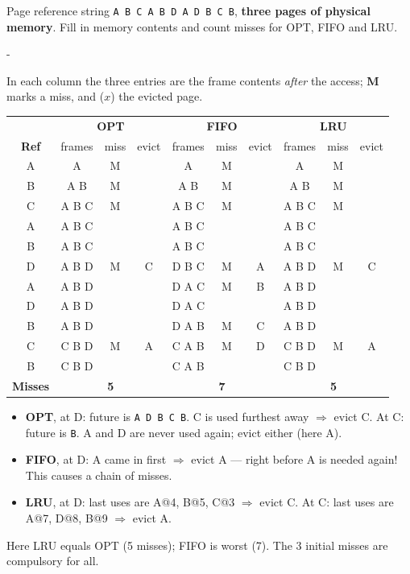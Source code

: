 \documentclass[11pt,a4paper]{article}
\makeatletter
\newcommand{\keepspace}[1]{\par\penalty-100\begingroup
  \setlength{\dimen@}{#1}\dimen@ii\pagegoal\advance\dimen@ii-\pagetotal
  \ifdim\dimen@>\dimen@ii\ifdim\dimen@ii>\z@\vfil\fi\break\fi\endgroup}
\makeatother
\begin{document}
\begin{quizbox}
Page reference string \texttt{A B C A B D A D B C B}, \textbf{three pages
of physical memory}. Fill in memory contents and count misses for OPT,
FIFO and LRU.
\end{quizbox}

\keepspace{22\baselineskip}
\begin{solbox}[Solution]
In each column the three entries are the frame contents \emph{after} the
access; \textbf{M} marks a miss, and (\(x\)) the evicted page.
\begin{center}
\renewcommand{\arraystretch}{1.08}
\setlength{\tabcolsep}{5pt}
\begin{tabular}{@{}c|ccc|ccc|ccc@{}}
  \toprule
  & \multicolumn{3}{c|}{\textbf{OPT}} & \multicolumn{3}{c|}{\textbf{FIFO}} & \multicolumn{3}{c}{\textbf{LRU}} \\
  \textbf{Ref} & frames & miss & evict & frames & miss & evict & frames & miss & evict \\
  \midrule
  A & A      & M &   & A     & M &   & A     & M & \\
  B & A B    & M &   & A B   & M &   & A B   & M & \\
  C & A B C  & M &   & A B C & M &   & A B C & M & \\
  A & A B C  &   &   & A B C &   &   & A B C &   & \\
  B & A B C  &   &   & A B C &   &   & A B C &   & \\
  D & A B D  & M & C & D B C & M & A & A B D & M & C \\
  A & A B D  &   &   & D A C & M & B & A B D &   & \\
  D & A B D  &   &   & D A C &   &   & A B D &   & \\
  B & A B D  &   &   & D A B & M & C & A B D &   & \\
  C & C B D  & M & A & C A B & M & D & C B D & M & A \\
  B & C B D  &   &   & C A B &   &   & C B D &   & \\
  \midrule
  \multicolumn{1}{c|}{\textbf{Misses}} & \multicolumn{3}{c|}{\textbf{5}} &
  \multicolumn{3}{c|}{\textbf{7}} & \multicolumn{3}{c}{\textbf{5}} \\
  \bottomrule
\end{tabular}
\end{center}
\begin{itemize}
  \item \textbf{OPT}, at D: future is \texttt{A D B C B}. C is used
        furthest away $\Rightarrow$ evict C. At C: future is \texttt{B}.
        A and D are never used again; evict either (here A).
  \item \textbf{FIFO}, at D: A came in first $\Rightarrow$ evict A ---
        right before A is needed again! This causes a chain of misses.
  \item \textbf{LRU}, at D: last uses are A@4, B@5, C@3 $\Rightarrow$
        evict C. At C: last uses are A@7, D@8, B@9 $\Rightarrow$ evict A.
\end{itemize}
Here LRU equals OPT (5 misses); FIFO is worst (7). The 3 initial misses
are compulsory for all.
\end{solbox}
\end{document}
